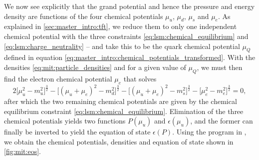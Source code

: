 We now see explicitly that the grand potential and hence the pressure and energy density are functions of the four chemical potentials $\mu_u$, $\mu_d$, $\mu_s$ and $\mu_e$.
As explained in \cref{sec:master_intro:tft},
we reduce them to only one independent chemical potential with the three constraints \eqref{eq:lsm:chemical_equilibrium} and \eqref{eq:lsm:charge_neutrality} --
and take this to be the quark chemical potential $\mu_Q$ defined in equation \eqref{eq:master_intro:chemical_potentials_transformed}.
With the densities \eqref{eq:mit:particle_densities} and for a given value of $\mu_Q$,
we must then find the electron chemical potential $\mu_e$ that solves
\begin{equation}
	2 \Big[\mu_u^2-m_u^2\Big]^\frac32
	- \Big[(\mu_u+\mu_e)^2-m_d^2\Big]^\frac32 
	- \Big[(\mu_u+\mu_e)^2-m_s^2\Big]^\frac32 
	- \Big[\mu_e^2-m_e^2\Big]^\frac32 = 0,
\label{eq:mit:charge_neutrality_explicit}
\end{equation}
after which the two remaining chemical potentials are given by the chemical equilibrium constraint \eqref{eq:lsm:chemical_equilibrium}. 
Elimination of the three chemical potentials yields two functions $P(\mu_u)$ and $\epsilon(\mu_u)$,
and the former can finally be inverted to yield the equation of state $\epsilon(P)$.
Using the program in ,
we obtain the chemical potentials, densities and equation of state shown in \cref{fig:mit:eos}.

